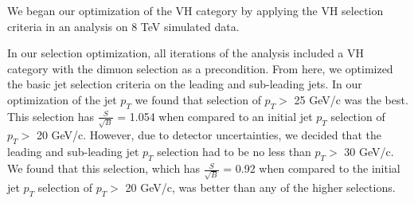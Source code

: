 \documentclass[12pt]{article}
\begin{document}
We began our optimization of the VH category by applying the VH selection criteria in an analysis on 8 TeV simulated data. 

In our selection optimization, all iterations of the analysis included a VH category with the dimuon selection as a precondition. 
From here, we optimized the basic jet selection criteria on the leading and sub-leading jets. 
In our optimization of the jet $p_{T}$ we found that selection of $p_{T}>$ 25 GeV/c was the best. 
This selection has $\frac{S}{\sqrt{B}}$ = 1.054 when compared to an initial jet $p_{T}$ selection of $p_{T}>$ 20 GeV/c. 
However, due to detector uncertainties, 
we decided that the leading and sub-leading jet $p_{T}$ selection had to be no less than $p_{T}>$ 30 GeV/c. 
We found that this selection, which has $\frac{S}{\sqrt{B}}$ = 0.92 when compared to the initial jet $p_{T}$ selection of $p_{T}>$ 20 GeV/c, 
was better than any of the higher selections. 
\end{document}
